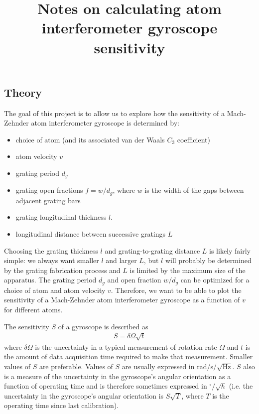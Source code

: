 \documentclass[twocolumn,pra,showpacs,superscriptaddress,longbibliography]{revtex4-1}   %
\begin{document}
\title{Notes on calculating atom interferometer gyroscope sensitivity}
\maketitle


\subsection{Theory}

The goal of this project is to allow us to explore how the sensitivity of a Mach-Zehnder atom interferometer gyroscope is determined by:
\begin{itemize}
	\item choice of atom (and its associated van der Waals $C_3$ coefficient)
	\item atom velocity $v$
	\item grating period $d_g$
	\item grating open fractions $f = w/d_g$, where $w$ is the width of the gaps between adjacent grating bars
	\item grating longitudinal thickness $l$.
	\item longitudinal distance between successive gratings $L$
\end{itemize}
Choosing the grating thickness $l$ and grating-to-grating distance $L$ is likely fairly simple: we always want smaller $l$ and larger $L$, but $l$ will probably be determined by the grating fabrication process and $L$ is limited by the maximum size of the apparatus. The grating period $d_g$ and open fraction $w/d_g$ can be optimized for a choice of atom and atom velocity $v$. Therefore, we want to be able to plot the sensitivity of a Mach-Zehnder atom interferometer gyroscope as a function of $v$ for different atoms.

The sensitivity $S$ of a gyroscope is described as 
\begin{align}
	S = \delta\Omega \sqrt{t}
	\label{sensitivityGeneral}
\end{align}
where $\delta\Omega$ is the uncertainty in a typical measurement of rotation rate $\Omega$ and $t$ is the amount of data acquisition time required to make that measurement. 
Smaller values of $S$ are preferable.
Values of $S$ are usually expressed in rad/s/$\sqrt{\mathrm{Hz}}$. 
$S$ also is a measure of the uncertainty in the gyroscope's angular orientation as a function of operating time and is therefore sometimes expressed in $^{\circ}/\sqrt{h}$ (i.e. the uncertainty in the gyroscope's angular orientation is $S\sqrt{T}$, where $T$ is the operating time since last calibration).
\end{document}
